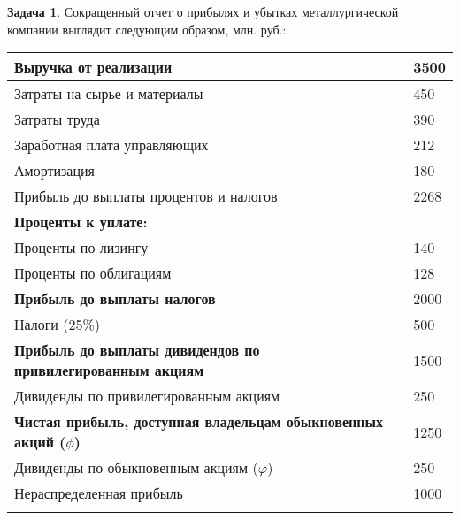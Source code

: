 \documentclass[a4paper, 14pt]{article}
\theoremstyle{plain} %
\theoremstyle{definition} %
\newtheorem{problem}{Задача}[subsection]
\theoremstyle{remark} %
\begin{document}
\newpage
\begin{problem}
	Сокращенный отчет о прибылях и убытках металлургической компании выглядит следующим образом, млн. руб.:
\begin{center}
\begin{tabular}{|l|l|}
\hline
\textbf{Выручка от реализации}                                     & 3500                  \\
\hline
Затраты на сырье и материалы                              & 450                   \\
\hline
Затраты труда                                             & 390                   \\
\hline
Заработная плата управляющих                              & 212                   \\
\hline
Амортизация                                               & 180                   \\
\hline
Прибыль до выплаты процентов и налогов                    & 2268                  \\
\hline
\textbf{Проценты к уплате:}                                        &                       \\
\hline
Проценты по лизингу                                       & 140                   \\
\hline
Проценты по облигациям                                    & 128                   \\
\hline
\textbf{Прибыль до выплаты налогов}                                & 2000                  \\
\hline
Налоги (25\%)                                             & 500                   \\
\hline
\textbf{Прибыль до выплаты дивидендов по привилегированным акциям} & 1500                  \\
\hline
Дивиденды по привилегированным акциям                     & 250                   \\
\hline
\textbf{Чистая прибыль, доступная владельцам обыкновенных акций ($\phi$)}   & 1250                  \\
\hline
Дивиденды по обыкновенным акциям ($\varphi$)                          & 250                   \\
\hline
Нераспределенная прибыль                                  & 1000                  \\
\hline
\multicolumn{1}{l}{}                                      & \multicolumn{1}{l}{}
\end{tabular}
\end{center}


\end{problem}
\end{document}
